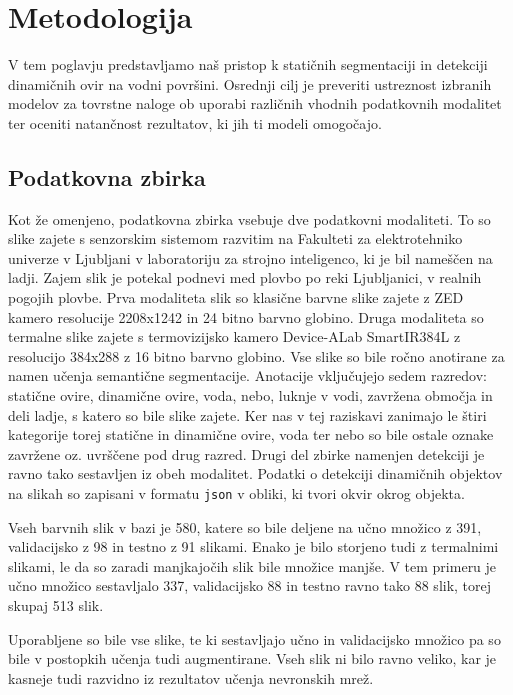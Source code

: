 \documentclass[10pt,twocolumn,letterpaper]{article}
\begin{document}

\section{Metodologija}
V tem poglavju predstavljamo naš pristop k statičnih segmentaciji in detekciji dinamičnih ovir na vodni površini. Osrednji cilj je preveriti ustreznost izbranih modelov za tovrstne naloge ob uporabi različnih vhodnih podatkovnih modalitet ter oceniti natančnost rezultatov, ki jih ti modeli omogočajo.

\subsection{Podatkovna zbirka}
Kot že omenjeno, podatkovna zbirka vsebuje dve podatkovni modaliteti. To so slike zajete s senzorskim sistemom razvitim na Fakulteti za elektrotehniko univerze v Ljubljani v laboratoriju za strojno inteligenco, ki je bil nameščen na ladji. Zajem slik je potekal podnevi med plovbo po reki Ljubljanici, v realnih pogojih plovbe. Prva modaliteta slik so klasične barvne slike zajete z ZED kamero resolucije 2208x1242 in 24 bitno barvno globino. Druga modaliteta so termalne slike zajete s termovizijsko kamero Device-ALab SmartIR384L z resolucijo 384x288 z 16 bitno barvno globino. Vse slike so bile ročno anotirane za namen učenja semantične segmentacije. Anotacije vključujejo sedem razredov: statične ovire, dinamične ovire, voda, nebo, luknje v vodi, zavržena območja in deli ladje, s katero so bile slike zajete. Ker nas v tej raziskavi zanimajo le štiri kategorije torej statične in dinamične ovire, voda ter nebo so bile ostale oznake zavržene oz. uvrščene pod drug razred. Drugi del zbirke namenjen detekciji je ravno tako sestavljen iz obeh modalitet. Podatki o detekciji dinamičnih objektov na slikah so zapisani v formatu \texttt{json} v obliki, ki tvori okvir okrog objekta. 

Vseh barvnih slik v bazi je 580, katere so bile deljene na učno množico z 391, validacijsko z 98 in testno z 91 slikami. Enako je bilo storjeno tudi z termalnimi slikami, le da so zaradi manjkajočih slik bile množice manjše. V tem primeru je učno množico sestavljalo 337, validacijsko 88 in testno ravno tako 88 slik, torej skupaj 513 slik.

Uporabljene so bile vse slike, te ki sestavljajo učno in validacijsko množico pa so bile v postopkih učenja tudi augmentirane. Vseh slik ni bilo ravno veliko, kar je kasneje tudi razvidno iz rezultatov učenja nevronskih mrež. 
\end{document}
